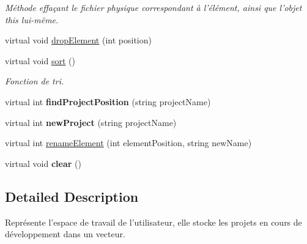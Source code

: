 \begin{DoxyCompactItemize}
\begin{DoxyCompactList}\small\item\em Méthode effaçant le fichier physique correspondant à l'élément, ainsi que l'objet this lui-\/même. \item\end{DoxyCompactList}\item 
virtual void \hyperlink{class_work_space_a3941dc541517b3f94a732c45559987da}{dropElement} (int position)
\item 
\hypertarget{class_work_space_a5aa3a61e755803e138eb8f4eac8f9e26}{
virtual void \hyperlink{class_work_space_a5aa3a61e755803e138eb8f4eac8f9e26}{sort} ()}
\label{class_work_space_a5aa3a61e755803e138eb8f4eac8f9e26}

\begin{DoxyCompactList}\small\item\em Fonction de tri. \item\end{DoxyCompactList}\item 
\hypertarget{class_work_space_aebbdefef57cb12bfbbbb5a00d4c04559}{
virtual int {\bfseries findProjectPosition} (string projectName)}
\label{class_work_space_aebbdefef57cb12bfbbbb5a00d4c04559}

\item 
\hypertarget{class_work_space_ac2fd9acbcc5e3c6fc1de10a752df9031}{
virtual int {\bfseries newProject} (string projectName)}
\label{class_work_space_ac2fd9acbcc5e3c6fc1de10a752df9031}

\item 
virtual int \hyperlink{class_work_space_a5282679131836d3f59acbb8bc5fe6abe}{renameElement} (int elementPosition, string newName)
\item 
\hypertarget{class_work_space_a22bd32344f9ff26347ee9b7546c4b3e0}{
virtual void {\bfseries clear} ()}
\label{class_work_space_a22bd32344f9ff26347ee9b7546c4b3e0}

\end{DoxyCompactItemize}


\subsection{Detailed Description}
Représente l'espace de travail de l'utilisateur, elle stocke les projets en cours de développement dans un vecteur. 

